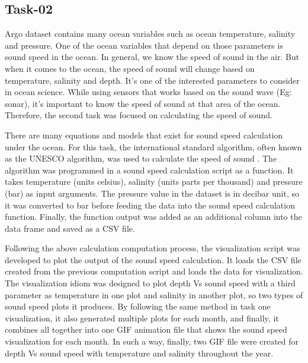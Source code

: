 \newpage
\subsection{Task-02}

Argo dataset contains many ocean variables such as ocean temperature, salinity and pressure. One of the ocean variables that depend on those parameters is sound speed in the ocean. In general, we know the speed of sound in the air. But when it comes to the ocean, the speed of sound will change based on temperature, salinity and depth. It’s one of the interested parameters to consider in ocean science. While using sensors that works based on the sound wave (Eg: sonar), it’s important to know the speed of sound at that area of the ocean. Therefore, the second task was focused on calculating the speed of sound. \newline

\noindent There are many equations and models that exist for sound speed calculation under the ocean. For this task, the international standard algorithm, often known as the UNESCO algorithm, was used to calculate the speed of sound \cite{xkcd}. The algorithm was programmed in a sound speed calculation script as a function. It takes temperature (units celsius), salinity (units parts per thousand) and pressure (bar) as input arguments. The pressure value in the dataset is in decibar unit, so it was converted to bar before feeding the data into the sound speed calculation function. Finally, the function output was added as an additional column into the data frame and saved as a CSV file. \newline

\noindent Following the above calculation computation process, the visualization script was developed to plot the output of the sound speed calculation. It loads the CSV file created from the previous computation script and loads the data for visualization. The visualization idiom was designed to plot depth Vs sound speed with a third parameter as temperature in one plot and salinity in another plot, so two types of sound speed plots it produces. By following the same method in task one visualization, it also generated multiple plots for each month, and finally, it combines all together into one GIF animation file that shows the sound speed visualization for each month. In such a way, finally, two GIF file were created for depth Vs sound speed with temperature and salinity throughout the year. 

\newpage

